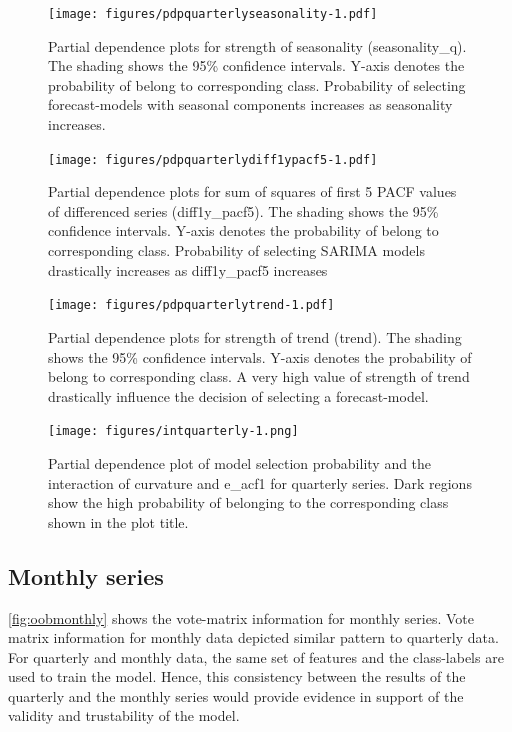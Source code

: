 \documentclass[11pt,a4paper,]{article}
\begin{document}
\begin{figure}
\centering
\texttt{[image: figures/pdpquarterlyseasonality-1.pdf]}
\caption{\label{fig:pdpquarterlyseasonality}Partial dependence plots for strength of seasonality (seasonality\_q). The shading shows the 95\% confidence intervals. Y-axis denotes the probability of belong to corresponding class. Probability of selecting forecast-models with seasonal components increases as seasonality increases.}
\end{figure}

\begin{figure}
\centering
\texttt{[image: figures/pdpquarterlydiff1ypacf5-1.pdf]}
\caption{\label{fig:pdpquarterlydiff1ypacf5}Partial dependence plots for sum of squares of first 5 PACF values of differenced series (diff1y\_pacf5). The shading shows the 95\% confidence intervals. Y-axis denotes the probability of belong to corresponding class. Probability of selecting SARIMA models drastically increases as diff1y\_pacf5 increases}
\end{figure}

\begin{figure}
\centering
\texttt{[image: figures/pdpquarterlytrend-1.pdf]}
\caption{\label{fig:pdpquarterlytrend}Partial dependence plots for strength of trend (trend). The shading shows the 95\% confidence intervals. Y-axis denotes the probability of belong to corresponding class. A very high value of strength of trend drastically influence the decision of selecting a forecast-model.}
\end{figure}

\begin{figure}
\centering
\texttt{[image: figures/intquarterly-1.png]}
\caption{\label{fig:intquarterly}Partial dependence plot of model selection probability and the interaction of curvature and e\_acf1 for quarterly series. Dark regions show the high probability of belonging to the corresponding class shown in the plot title.}
\end{figure}

\hypertarget{monthly-series}{%
\subsection{Monthly series}\label{monthly-series}}

\autoref{fig:oobmonthly} shows the vote-matrix information for monthly series. Vote matrix information for monthly data depicted similar pattern to quarterly data. For quarterly and monthly data, the same set of features and the class-labels are used to train the model. Hence, this consistency between the results of the quarterly and the monthly series would provide evidence in support of the validity and trustability of the model.
\end{document}
